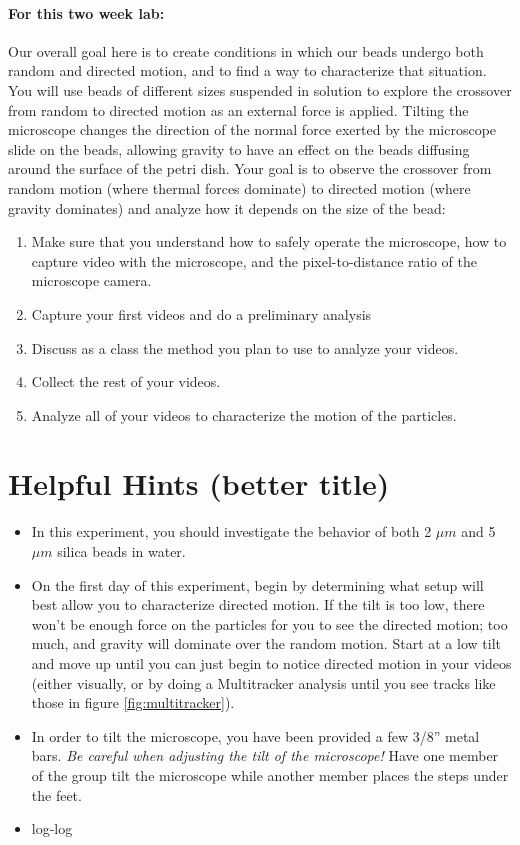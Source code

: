 \paragraph{For this two week lab:} Our overall goal here is to create conditions in which our beads undergo both random and directed motion, and to find a way to characterize that situation. 
You will use beads of different sizes suspended in solution to explore the crossover from random to directed motion as an external force is applied.
Tilting the microscope changes the direction of the normal force exerted by the microscope slide on the beads, allowing gravity to have an effect on the beads diffusing around the surface of the petri dish.
Your goal is to observe the crossover from random motion (where thermal forces dominate) to directed motion (where gravity dominates) and analyze how it depends on the size of the bead:
\begin{enumerate}
\item Make sure that you understand how to safely operate the microscope, how to capture video with the microscope, and the pixel-to-distance ratio of the microscope camera.
\item Capture your first videos and do a preliminary analysis
\item Discuss as a class the method you plan to use to analyze your videos.
\item Collect the rest of your videos.
\item Analyze all of your videos to characterize the motion of the particles.
\end{enumerate}

\section*{Helpful Hints (better title)}

\begin{itemize}
\item In this experiment, you should investigate the behavior of both 2 $\mu m$ and 5 $\mu m$ silica beads in water.
\item On the first day of this experiment, begin by determining what setup will best allow you to characterize directed motion. If the tilt is too low, there won't be enough force on the particles for you to see the directed motion; too much, and gravity will dominate over the random motion. Start at a low tilt and move up until you can just begin to notice directed motion in your videos (either visually, or by doing a Multitracker analysis until you see tracks like those in figure \ref{fig:multitracker}).
\item In order to tilt the microscope, you have been provided a few 3/8'' metal bars. \emph{Be careful when adjusting the tilt of the microscope!} Have one member of the group tilt the microscope while another member places the steps under the feet.
\item log-log
\end{itemize}


